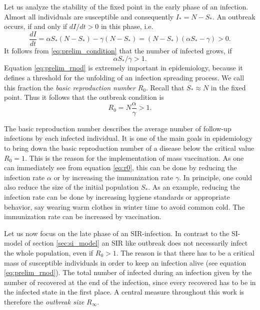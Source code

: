 \documentclass[openright,twoside,headsepline]{scrbook}
\begin{document}
Let us analyze the stability of the fixed point in the early phase of an infection.
Almost all individuals are susceptible and consequently $I_*=N-S_*$.
An outbreak occurs, if and only if $dI/dt >0$ in this phase, i.e.
\begin{equation}\label{eq:prelim_condition}
\frac{dI}{dt}=\alpha S_* (N-S_*) - \gamma (N-S_*)=(N-S_*)(\alpha S_* -\gamma ) >0.
\end{equation}
It follows from \eqref{eq:prelim_condition} that the number of infected grows, if
\begin{equation}\label{eq:prelim_rnod}
\alpha S_* / \gamma >1.
\end{equation}
Equation \eqref{eq:prelim_rnod} is extremely important in epidemiology, because it defines a threshold for the unfolding of an infection spreading process.
We call this fraction the \emph{basic reproduction number} $R_0$.
Recall that $S_* \approx N$ in the fixed point.
Thus it follows that the outbreak condition is
\begin{equation} \label{eq:r0}
R_0 = N \frac{\alpha }{\gamma } >1.
\end{equation}

The basic reproduction number describes the average number of follow-up infections by each infected individual.
It is one of the main goals in epidemiology to bring down the basic reproduction number of a disease below the critical value $R_0=1$.
This is the reason for the implementation of mass vaccination.
As one can immediately see from equation \eqref{eq:r0}, this can be done by reducing the infection rate $\alpha $ or by increasing the immunization rate $\gamma $.
In principle, one could also reduce the size of the initial population $S_*$.
As an example, reducing the infection rate can be done by increasing hygiene standards or appropriate behavior, say wearing warm clothes in winter time to avoid common cold.
The immunization rate can be increased by vaccination.

Let us now focus on the late phase of an SIR-infection.
In contrast to the SI-model of section \ref{sec:si_model} an SIR like outbreak does not necessarily infect the whole population, even if $R_0>1$.
The reason is that there has to be a critical mass of susceptible individuals in order to keep an infection alive (see equation \eqref{eq:prelim_rnod}).
The total number of infected during an infection given by the number of recovered at the end of the infection, since every recovered has to be in the infected state in the first place.
A central measure throughout this work is therefore the \emph{outbreak size} $R_\infty$.
\end{document}
